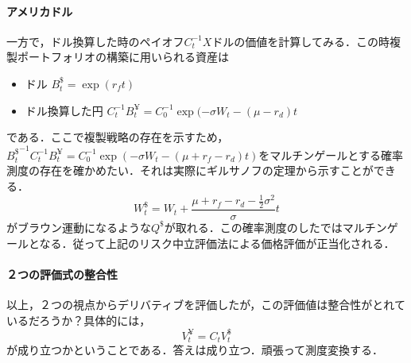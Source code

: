 \documentclass{jsarticle}
\theoremstyle{definition}
\begin{document}
\paragraph{アメリカドル}
一方で，ドル換算した時のペイオフ$C_t^{-1}X$ドルの価値を計算してみる．この時複製ポートフォリオの構築に用いられる資産は
\begin{itemize}
    \item ドル $B_t^\$ = \exp{(r_f t)}$
    \item ドル換算した円 $C_t^{-1} B_t^¥ = C_0^{-1}\exp{(-\sigma W_t - (\mu - r_d)t}$
\end{itemize}
である．ここで複製戦略の存在を示すため，${B_t^\$}^{-1} C_t^{-1} B_t^¥ = C_0^{-1}\exp{(-\sigma W_t - (\mu + r_f - r_d)t)}$をマルチンゲールとする確率測度の存在を確かめたい．それは実際にギルサノフの定理から示すことができる．
$$
 W_t^\$ = W_t + \frac{\mu + r_f - r_d - \frac{1}{2}\sigma^2}{\sigma} t
$$
がブラウン運動になるような$Q^\$$が取れる．この確率測度のしたではマルチンゲールとなる．従って上記のリスク中立評価法による価格評価が正当化される．

\paragraph{２つの評価式の整合性}
以上，２つの視点からデリバティブを評価したが，この評価値は整合性がとれているだろうか？具体的には，
$$
 V_t^¥ = C_t V_t^\$
$$
が成り立つかということである．答えは成り立つ．頑張って測度変換する．
\end{document}
